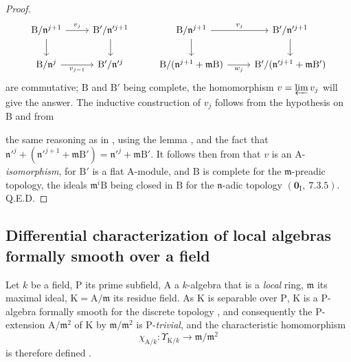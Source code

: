 \begin{proof}
\[
  \begin{tikzcd}
    \mathrm{B}/\mathfrak{n}^{j+1} \ar[r,"v_j"] \ar[d] & \mathrm{B}'/\mathfrak{n}'^{j+1} \ar[d] & \mathrm{B}/\mathfrak{n}^{j+1} \ar[r,"v_j"] \ar[d] & \mathrm{B}'/\mathfrak{n}'^{j+1} \ar[d]\\
    \mathrm{B}/\mathfrak{n}^j \ar[r,"v_{j-1}"'] & \mathrm{B}'/\mathfrak{n}'^j & \mathrm{B}/(\mathfrak{n}^{j+1}+\mathfrak{m}\mathrm{B}) \ar[r,"w_j"'] & \mathrm{B}'/(\mathfrak{n}'^{j+1}+\mathfrak{m}\mathrm{B}')
  \end{tikzcd}
\]
are commutative; $\mathrm{B}$ and $\mathrm{B}'$ being complete, the homomorphism $v=\varprojlim v_j$ will give the answer. The inductive construction of $v_j$ follows from the hypothesis on $\mathrm{B}$ and from


the same reasoning as in , using the lemma , and the fact that $\mathfrak{n}'^j+(\mathfrak{n}'^{j+1}+\mathfrak{m}\mathrm{B}')=\mathfrak{n}'^j+\mathfrak{m}\mathrm{B}'$.
It follows then from  that $v$ is an $\mathrm{A}$-\emph{isomorphism}, for $\mathrm{B}'$ is a flat $\mathrm{A}$-module, and $\mathrm{B}$ is complete for the $\mathfrak{m}$-preadic topology, the ideals $\mathfrak{m}^i\mathrm{B}$ being closed in $\mathrm{B}$ for the $\mathfrak{n}$-adic topology $(\mathbf{0}_\mathrm{I},~7.3.5)$.
\hfill Q.E.D.
\end{proof}

\subsection{Differential characterization of local algebras formally smooth over a field}
\label{subsection:0.22.2}

\begin{env}[22.2.1]
\label{0.22.2.1}
Let $k$ be a field, $\mathrm{P}$ its prime subfield, $\mathrm{A}$ a $k$-algebra that is a \emph{local} ring, $\mathfrak{m}$ its maximal ideal, $\mathrm{K}=\mathrm{A}/\mathfrak{m}$ its residue field.
As $\mathrm{K}$ is separable over $\mathrm{P}$, $\mathrm{K}$ is a $\mathrm{P}$-algebra formally smooth for the discrete topology , and consequently the $\mathrm{P}$-extension $\mathrm{A}/\mathfrak{m}^2$ of $\mathrm{K}$ by $\mathfrak{m}/\mathfrak{m}^2$ is $\mathrm{P}$-\emph{trivial}, and the characteristic homomorphism
\[
\label{0.22.2.1.1}
  \chi_{\mathrm{A}/k}:\Upsilon_{\mathrm{K}/k}\to\mathfrak{m}/\mathfrak{m}^2
  \tag{22.2.1.1}
\]
is therefore defined .
\end{env}

